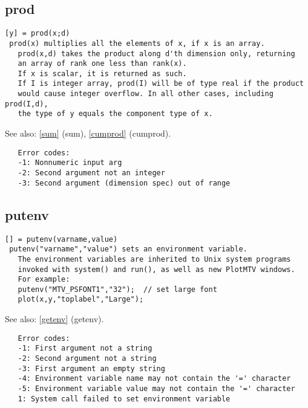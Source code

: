 \documentclass[a4paper]{article}
\begin{document}
\subsection{prod\label{prod}}

\begin{tscreen}
\begin{verbatim}
[y] = prod(x;d)
 prod(x) multiplies all the elements of x, if x is an array.
   prod(x,d) takes the product along d'th dimension only, returning
   an array of rank one less than rank(x).
   If x is scalar, it is returned as such.
   If I is integer array, prod(I) will be of type real if the product
   would cause integer overflow. In all other cases, including prod(I,d),
   the type of y equals the component type of x.
\end{verbatim}

See also: \ref{sum} {(sum)}, \ref{cumprod} {(cumprod)}.
\begin{verbatim}
   Error codes:
   -1: Nonnumeric input arg
   -2: Second argument not an integer
   -3: Second argument (dimension spec) out of range 
\end{verbatim}
\end{tscreen}



\subsection{putenv\label{putenv}}

\begin{tscreen}
\begin{verbatim}
[] = putenv(varname,value)
 putenv("varname","value") sets an environment variable.
   The environment variables are inherited to Unix system programs
   invoked with system() and run(), as well as new PlotMTV windows.
   For example:
   putenv("MTV_PSFONT1","32");  // set large font
   plot(x,y,"toplabel","Large");
\end{verbatim}

See also: \ref{getenv} {(getenv)}.
\begin{verbatim}
   Error codes:
   -1: First argument not a string
   -2: Second argument not a string
   -3: First argument an empty string
   -4: Environment variable name may not contain the '=' character
   -5: Environment variable value may not contain the '=' character
   1: System call failed to set environment variable
\end{verbatim}
\end{tscreen}
\end{document}

